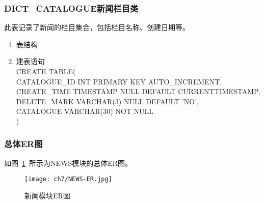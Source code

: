 \subsubsection{DICT\_CATALOGUE新闻栏目类}
此表记录了新闻的栏目集合，包括栏目名称、创建日期等。
\begin{enumerate}
    \item 表结构
    \begin{table}[htbp]
        \centering
        \end{table}
    \item 建表语句\\
        CREATE TABLE(\\
            CATALOGUE\_ID INT PRIMARY KEY AUTO\_INCREMENT,\\
            CREATE\_TIME TIMESTAMP NULL DEFAULT CURRENTTIMESTAMP,\\
            DELETE\_MARK VARCHAR(3) NULL DEFAULT 'NO',\\
            CATALOGUE VARCHAR(30) NOT NULL \\
        )
    \end{enumerate}

\subsubsection{总体ER图}
如图~\ref{fig:NEWS-ER}~所示为NEWS模块的总体ER图。
\begin{figure}[htbp]
    \centering
    \texttt{[image: ch7/NEWS-ER.jpg]}
    \caption{新闻模块ER图}\label{fig:NEWS-ER}
    \vspace{\baselineskip} %
\end{figure}

